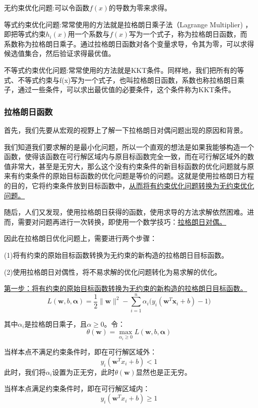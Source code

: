 \documentclass[UTF8]{ctexart} %
\begin{document}
\begin{multicols}{2}
				无约束优化问题:可以令函数$f(x)$的导数为零来求得。
				
				等式约束优化问题:常常使用的方法就是拉格朗日乘子法（Lagrange Multiplier) ，即把等式约束$h_i(x)$用一个系数与$f(x)$写为一个式子，称为拉格朗日函数，而系数称为拉格朗日乘子。通过拉格朗日函数对各个变量求导，令其为零，可以求得候选值集合，然后验证求得最优值。
				
				不等式约束优化问题:常常使用的方法就是KKT条件。同样地，我们把所有的等式、不等式约束与f(x)写为一个式子，也叫拉格朗日函数，系数也称拉格朗日乘子，通过一些条件，可以求出最优值的必要条件，这个条件称为KKT条件。
				
				\subsubsection{拉格朗日函数}
					首先，我们先要从宏观的视野上了解一下拉格朗日对偶问题出现的原因和背景。
					
					我们知道我们要求解的是最小化问题，所以一个直观的想法是如果我能够构造一个函数，使得该函数在可行解区域内与原目标函数完全一致，而在可行解区域外的数值非常大，甚至是无穷大，那么这个没有约束条件的新目标函数的优化问题就与原来有约束条件的原始目标函数的优化问题是等价的问题。这就是使用拉格朗日方程的目的，它将约束条件放到目标函数中，\uline{从而将有约束优化问题转换为无约束优化问题。}
					
					随后，人们又发现，使用拉格朗日获得的函数，使用求导的方法求解依然困难。进而，需要对问题再进行一次转换，即使用一个数学技巧：\uline{拉格朗日对偶。}
					
					因此在拉格朗日优化问题上，需要进行两个步骤：
					
					(1)将有约束的原始目标函数转换为无约束的新构造的拉格朗日目标函数。
					
					(2)使用拉格朗日对偶性，将不易求解的优化问题转化为易求解的优化。
					
					\uline{第一步：将有约束的原始目标函数转换为无约束的新构造的拉格朗日目标函数。}
					\[L(\bm{w},b,\bm{\alpha}) = \frac{1}{2}\|\bm{w}\|^2 - 
					\sum_{i=1}^n \alpha_i\big(y_i(\bm{w}^T\bm{x}_i+b)-1\big)\]
					
					其中$\alpha_i$是拉格朗日乘子，且$\alpha\geq0$。令：
					\[\theta (\bm{w}) = \max_{\alpha_i\geq0}L(\bm{w},b,\bm{\alpha})\]
				
					当样本点不满足约束条件时，即在可行解区域外：
					\[y_i(\bm{w}^Tx_i+b)<1\]
					此时，我们将$\alpha_i$设置为正无穷，此时$\theta(\bm{w})$显然也是正无穷。
				
					当样本点满足约束条件时，即在可行解区域内：
					\[y_i(\bm{w}^Tx_i+b)\geq1\]
					

\end{multicols}
\end{document}
